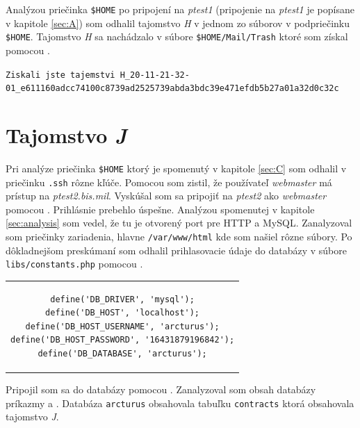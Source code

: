 \documentclass[11pt,a4paper]{article}
\begin{document}
Analýzou priečinka \texttt{\$HOME} po pripojení na \textit{ptest1} (pripojenie na \textit{ptest1} je popísane v kapitole \ref{sec:A}) som odhalil tajomstvo \textit{H} v jednom zo súborov v podpriečinku \texttt{\$HOME}. Tajomstvo \textit{H} sa nachádzalo v súbore \texttt{\$HOME/Mail/Trash} ktoré som získal pomocou .

\begin{center}
\small{\texttt{Ziskali jste tajemstvi H\_20-11-21-32-01\_e611160adcc74100c8739ad2525739abda3bdc39e471efdb5b27a01a32d0c32c}}
\end{center}

\section{Tajomstvo \textit{J}}\label{sec:J}

Pri analýze priečinka \texttt{\$HOME} ktorý je spomenutý v kapitole \ref{sec:C} som odhalil v priečinku \texttt{.ssh} rôzne kľúče. Pomocou  som zistil, že používateľ \textit{webmaster} má prístup na \textit{ptest2.bis.mil}. Vyskúšal som sa pripojiť na \textit{ptest2} ako \textit{webmaster} pomocou . Prihlásnie prebehlo úspešne. Analýzou spomenutej v kapitole \ref{sec:analysis} som vedel, že tu je otvorený port pre HTTP a MySQL. Zanalyzoval som priečinky zariadenia, hlavne \texttt{/var/www/html} kde som našiel rôzne súbory. Po dôkladnejšom preskúmaní som odhalil prihlasovacie údaje do databázy v súbore \texttt{libs/constants.php} pomocou .

\begin{center}
\begin{tabular}{c}
\begin{lstlisting}[basicstyle=\footnotesize]
define('DB_DRIVER', 'mysql');
define('DB_HOST', 'localhost');
define('DB_HOST_USERNAME', 'arcturus');
define('DB_HOST_PASSWORD', '16431879196842');
define('DB_DATABASE', 'arcturus');
\end{lstlisting}
\end{tabular}
\end{center}

 Pripojil som sa do databázy pomocou . Zanalyzoval som obsah databázy príkazmy  a . Databáza \texttt{arcturus} obsahovala tabuľku \texttt{contracts} ktorá obsahovala tajomstvo \textit{J}.
\end{document}
